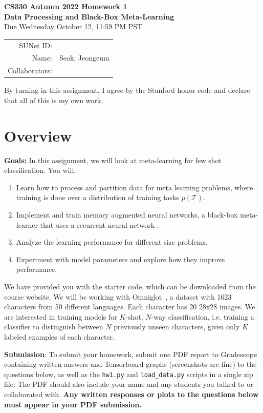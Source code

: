 \documentclass[12pt]{article}
\begin{document}
\begin{center}
{\Large \textbf{CS330 Autumn 2022 Homework 1 \\ Data Processing and Black-Box Meta-Learning}}
\\ {\large Due Wednesday October 12, 11:59 PM PST}

\begin{tabular}{rl}
SUNet ID: &  \\
Name: & Seok, Jeongeum\\
Collaborators: & 
\end{tabular}
\end{center}

By turning in this assignment, I agree by the Stanford honor code and declare
that all of this is my own work.

\section*{Overview}

\textbf{Goals:} In this assignment, we will look at meta-learning for few shot classification. You will:
\begin{enumerate}
    \item Learn how to process and partition data for meta learning problems, where training is done over a distribution of training tasks $p(\mathcal{T})$.
    \item Implement and train memory augmented neural networks, a black-box meta-learner that uses a recurrent neural network \cite{pmlr-v48-santoro16}.
    \item Analyze the learning performance for different size problems.
    \item Experiment with model parameters and explore how they improve performance.
\end{enumerate}

We have provided you with the starter code, which can be downloaded from the course website. We will be working with Omniglot~\cite{Lake1332}, a dataset with 1623 characters from 50 different languages. Each character has 20 28x28 images.
We are interested in training models for $K$-shot, $N$-way classification, i.e. training a classifier to distinguish between $N$ previously unseen characters, given only $K$ labeled examples of each character.

\vspace{0.2cm}
\noindent\textbf{Submission}: To submit your homework, submit one PDF report to Gradescope containing written answers and Tensorboard graphs (screenshots are fine) to the questions below, as well as the \texttt{hw1.py} and \texttt{load\_data.py} scripts in a single zip file. The PDF should also include your name and any students you talked to or collaborated with. \textbf{Any written responses or plots to the questions below must appear in your PDF submission.} 
\end{document}
